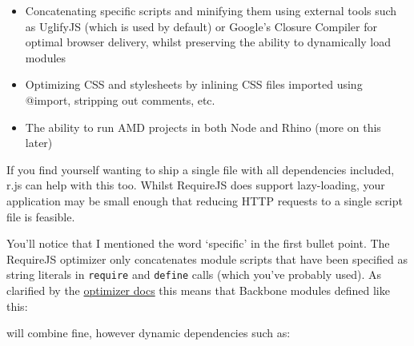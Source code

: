 \documentclass[9pt]{book}
\newenvironment{Shaded}{}{}
\newcommand{\KeywordTok}[1]{\textcolor[rgb]{0.00,0.44,0.13}{\textbf{{#1}}}}
\newcommand{\StringTok}[1]{\textcolor[rgb]{0.25,0.44,0.63}{{#1}}}
\newcommand{\CommentTok}[1]{\textcolor[rgb]{0.38,0.63,0.69}{\textit{{#1}}}}
\newcommand{\FunctionTok}[1]{\textcolor[rgb]{0.02,0.16,0.49}{{#1}}}
\newcommand{\NormalTok}[1]{{#1}}
\begin{document}
\begin{itemize}
\itemsep1pt\parskip0pt
\item
  Concatenating specific scripts and minifying them using external tools
  such as UglifyJS (which is used by default) or Google's Closure
  Compiler for optimal browser delivery, whilst preserving the ability
  to dynamically load modules
\item
  Optimizing CSS and stylesheets by inlining CSS files imported using
  @import, stripping out comments, etc.
\item
  The ability to run AMD projects in both Node and Rhino (more on this
  later)
\end{itemize}

If you find yourself wanting to ship a single file with all dependencies
included, r.js can help with this too. Whilst RequireJS does support
lazy-loading, your application may be small enough that reducing HTTP
requests to a single script file is feasible.

You'll notice that I mentioned the word `specific' in the first bullet
point. The RequireJS optimizer only concatenates module scripts that
have been specified as string literals in \texttt{require} and
\texttt{define} calls (which you've probably used). As clarified by the
\href{http://requirejs.org/docs/optimization.html}{optimizer docs} this
means that Backbone modules defined like this:

\begin{Shaded}
\end{Shaded}

will combine fine, however dynamic dependencies such as:

\begin{Shaded}
\end{Shaded}
\end{document}

